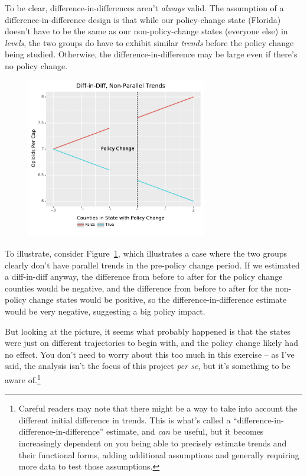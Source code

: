\documentclass[12pt]{article}
\begin{document}
To be clear, difference-in-differences aren't \emph{always} valid. The assumption of a difference-in-difference design is that while our policy-change state (Florida) doesn't have to be the same as our non-policy-change states (everyone else) in \emph{levels}, the two groups do have to exhibit similar \emph{trends} before the policy change being studied. Otherwise, the difference-in-difference may be large even if there's no policy change.

\begin{figure}[h!]
  \centering
  \caption{}\label{figure_diffindiff_nonparallel}
  \includegraphics[width=0.7\textwidth]{images/diffindiff_non_parallel.pdf}
\end{figure}


To illustrate, consider Figure~\ref{figure_diffindiff_nonparallel}, which illustrates a case where the two groups clearly don't have parallel trends in the pre-policy change period. If we estimated a diff-in-diff anyway, the difference from before to after for the policy change counties would be negative, and the difference from before to after for the non-policy change states would be positive, so the difference-in-difference estimate would be very negative, suggesting a big policy impact.

But looking at the picture, it seems what probably happened is that the states were just on different trajectories to begin with, and the policy change likely had no effect. You don't need to worry about this too much in this exercise -- as I've said, the analysis isn't the focus of this project \emph{per se}, but it's something to be aware of.\footnote{Careful readers may note that there might be a way to take into account the different initial difference in trends. This is what's called a ``difference-in-difference-in-difference'' estimate, and \emph{can} be useful, but it becomes increasingly dependent on you being able to precisely estimate trends and their functional forms, adding additional assumptions and generally requiring more data to test those assumptions.}
\end{document}
